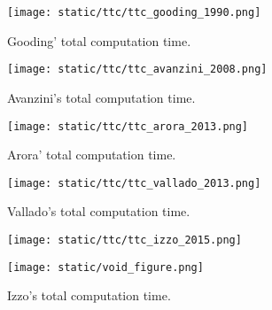 \begin{figure}[H]
  \begin{minipage}{0.48\textwidth}
    \centering
    \texttt{[image: static/ttc/ttc\_gooding\_1990.png]}
    \caption{Gooding' total computation time.}\label{fig:ttc_gooding}
  \end{minipage}\hfill
  \begin{minipage}{0.48\textwidth}
    \centering
    \texttt{[image: static/ttc/ttc\_avanzini\_2008.png]}
    \caption{Avanzini's total computation time.}\label{fig:ttc_avanzini}
  \end{minipage}
\end{figure}

\begin{figure}[H]
  \begin{minipage}{0.48\textwidth}
    \centering
    \texttt{[image: static/ttc/ttc\_arora\_2013.png]}
    \caption{Arora' total computation time.}\label{fig:ttc_arora}
  \end{minipage}\hfill
  \begin{minipage}{0.48\textwidth}
    \centering
    \texttt{[image: static/ttc/ttc\_vallado\_2013.png]}
    \caption{Vallado's total computation time.}\label{fig:ttc_vallado}
  \end{minipage}
\end{figure}

\begin{figure}[H]
  \begin{minipage}{0.48\textwidth}
    \centering
    \texttt{[image: static/ttc/ttc\_izzo\_2015.png]}
    \caption{Izzo's total computation time.}\label{fig:ttc_izzo}
  \end{minipage}\hfill
  \begin{minipage}{0.48\textwidth}
    \centering
    \texttt{[image: static/void\_figure.png]}
  \end{minipage}
\end{figure}
